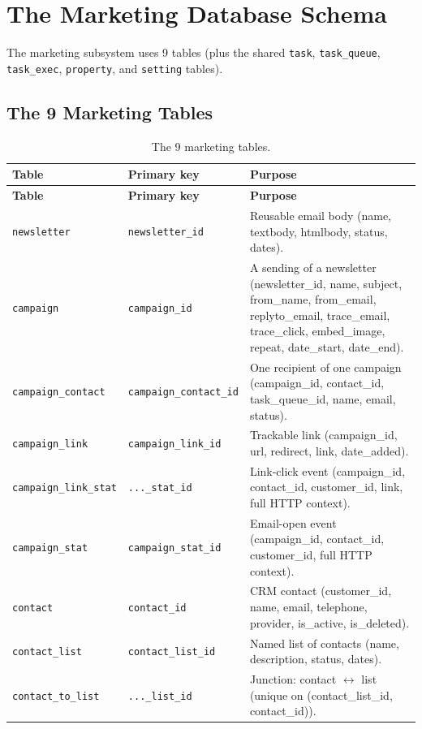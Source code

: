 \documentclass[11pt,a4paper]{article}
\begin{document}
\section{The Marketing Database Schema}\label{sec:schema}

The marketing subsystem uses 9 tables (plus the shared
\texttt{task}, \texttt{task\_queue}, \texttt{task\_exec},
\texttt{property}, and \texttt{setting} tables).

\subsection{The 9 Marketing Tables}

\footnotesize\sloppy
\begin{longtable}{>{\raggedright\arraybackslash}p{3.4cm}p{3.4cm}>{\raggedright\arraybackslash}p{7.5cm}}
\caption{The 9 marketing tables.}\label{tab:marketing-tables}\\
\toprule
\textbf{Table} & \textbf{Primary key} & \textbf{Purpose} \\
\midrule
\endfirsthead
\toprule
\textbf{Table} & \textbf{Primary key} & \textbf{Purpose} \\
\midrule
\endhead
\bottomrule
\endfoot
\texttt{newsletter}             & \texttt{newsletter\_id}        & Reusable email body (name, textbody, htmlbody, status, dates). \\
\texttt{campaign}               & \texttt{campaign\_id}          & A sending of a newsletter (newsletter\_id, name, subject, from\_name, from\_email, replyto\_email, trace\_email, trace\_click, embed\_image, repeat, date\_start, date\_end). \\
\texttt{campaign\_contact}      & \texttt{campaign\_contact\_id} & One recipient of one campaign (campaign\_id, contact\_id, task\_queue\_id, name, email, status). \\
\texttt{campaign\_link}         & \texttt{campaign\_link\_id}    & Trackable link (campaign\_id, url, redirect, link, date\_added). \\
\texttt{campaign\_link\_stat}   & \texttt{...\_stat\_id}         & Link-click event (campaign\_id, contact\_id, customer\_id, link, full HTTP context). \\
\texttt{campaign\_stat}         & \texttt{campaign\_stat\_id}    & Email-open event (campaign\_id, contact\_id, customer\_id, full HTTP context). \\
\texttt{contact}                & \texttt{contact\_id}           & CRM contact (customer\_id, name, email, telephone, provider, is\_active, is\_deleted). \\
\texttt{contact\_list}          & \texttt{contact\_list\_id}     & Named list of contacts (name, description, status, dates). \\
\texttt{contact\_to\_list}      & \texttt{...\_list\_id}         & Junction: contact $\leftrightarrow$ list (unique on (contact\_list\_id, contact\_id)). \\
\end{longtable}
\end{document}
